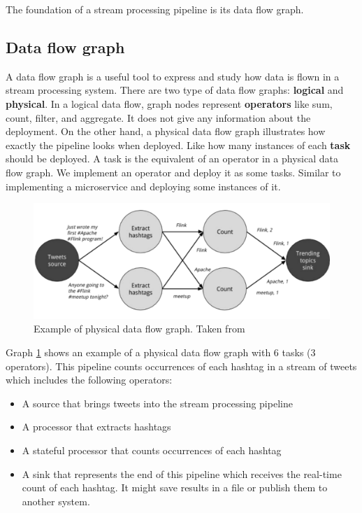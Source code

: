\documentclass[a4]{report}
\begin{document}
    The foundation of a stream processing pipeline is its data flow graph.

    \subsection{Data flow graph}
    A data flow graph is a useful tool to express and study how data is flown in a stream processing system.
    There are two type of data flow graphs: \textbf{logical} and \textbf{physical}.
    In a logical data flow, graph nodes represent \textbf{operators} like sum, count, filter, and aggregate.
    It does not give any information about the deployment.
    On the other hand, a physical data flow graph illustrates how exactly the pipeline looks when deployed.
    Like how many instances of each \textbf{task} should be deployed.
    A task is the equivalent of an operator in a physical data flow graph.
    We implement an operator and deploy it as some tasks.
    Similar to implementing a microservice and deploying some instances of it.

    \begin{figure}[ht]
        \caption{Example of physical data flow graph. Taken from \cite{flink}}
        \label{physical-data-flow-graph-example}
        \includegraphics[width=\linewidth, scale=0.6]{images/physical-data-flow-graph.png}
    \end{figure}

    Graph \ref{physical-data-flow-graph-example} shows an example of a physical data flow graph with 6 tasks (3
    operators).
    This pipeline counts occurrences of each hashtag in a stream of tweets which includes the following operators:

    \begin{itemize}
        \item A source that brings tweets into the stream processing pipeline
        \item A processor that extracts hashtags
        \item A stateful processor that counts occurrences of each hashtag
        \item A sink that represents the end of this pipeline which receives the real-time count of each hashtag. It might
        save results in a file or publish them to another system.
    \end{itemize}
\end{document}
